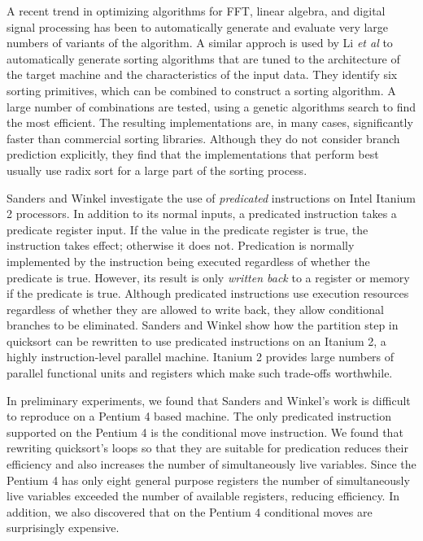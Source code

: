 \documentclass[acmtocl]{acmtrans2m}
\begin{document}
A recent trend in optimizing algorithms for FFT, linear algebra, and
digital signal processing has been to automatically generate and
evaluate very large numbers of variants of the algorithm.  A similar
approch is used by Li \textit{et al} \citeyear{Li+05} to automatically generate sorting
algorithms that are tuned to the architecture of the target machine
and the characteristics of the input data. They identify six sorting
primitives, which can be combined to construct a sorting algorithm.  A
large number of combinations are tested, using a genetic algorithms
search to find the most efficient. The resulting implementations are,
in many cases, significantly faster than commercial sorting libraries.
Although they do not consider branch prediction explicitly, they find
that the implementations that perform best usually use radix sort for
a large part of the sorting process.

Sanders and Winkel \citeyear{Sanders+04} investigate the use of \emph{predicated}
instructions on Intel Itanium 2 processors. In
addition to its normal inputs, a predicated instruction takes a
predicate register input. If the value in the predicate register is
true, the instruction takes effect; otherwise it does not. Predication
is normally implemented by the instruction being executed regardless
of whether the predicate is true. However, its result is only
\textit{written back} to a register or memory if the predicate is
true. Although predicated instructions use execution resources
regardless of whether they are allowed to write back, they allow
conditional branches to be eliminated.  Sanders and Winkel show how
the partition step in quicksort can be rewritten to use predicated
instructions on an Itanium 2, a highly instruction-level parallel
machine. Itanium 2 provides large numbers of parallel functional
units and registers which make such trade-offs worthwhile. 

In  
preliminary experiments, we found that Sanders and Winkel's work is difficult 
to reproduce on a Pentium 4 based machine. The only predicated instruction
supported on the Pentium 4 is the conditional move instruction. We found that
rewriting
quicksort's loops so that they are suitable for predication
reduces their efficiency and also increases the number of simultaneously
live variables. Since the Pentium 4 has only eight general
purpose registers the number of simultaneously live variables exceeded
the number of available registers, reducing efficiency. In addition,
we also discovered that on the Pentium 4 conditional moves are
surprisingly expensive.
\end{document}
